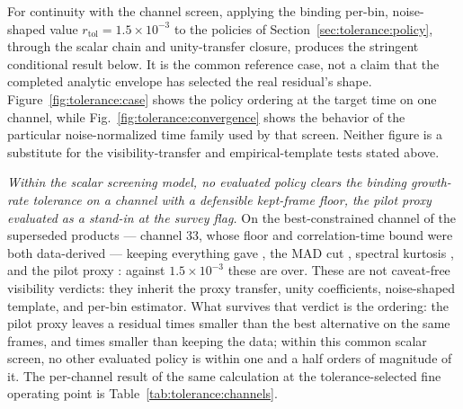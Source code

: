 For continuity with the channel screen, applying the binding per-bin, noise-shaped value $r_{\text{tol}}=1.5\times10^{-3}$ to the policies of Section~\ref{sec:tolerance:policy}, through the scalar chain and unity-transfer closure, produces the stringent conditional result below.  It is the common reference case, not a claim that the completed analytic envelope has selected the real residual's shape. Figure~\ref{fig:tolerance:case} shows the policy ordering at the target time on one channel, while Fig.~\ref{fig:tolerance:convergence} shows the behavior of the particular noise-normalized time family used by that screen.  Neither figure is a substitute for the visibility-transfer and empirical-template tests stated above.

\emph{Within the scalar screening model, no evaluated policy clears the binding growth-rate tolerance on a channel with a defensible kept-frame floor, the pilot proxy evaluated as a stand-in at the survey flag.} On the best-constrained channel of the superseded products --- channel 33, whose floor and correlation-time bound were both data-derived --- keeping everything gave , the MAD cut , spectral kurtosis , and the pilot proxy : against $1.5\times10^{-3}$ these are  over.  These are not caveat-free visibility verdicts: they inherit the proxy transfer, unity coefficients, noise-shaped template, and per-bin estimator.  What survives that verdict is the ordering: the pilot proxy leaves a residual  times smaller than the best alternative on the same frames, and  times smaller than keeping the data; within this common scalar screen, no other evaluated policy is within one and a half orders of magnitude of it.  The per-channel result of the same calculation at the tolerance-selected fine operating point is Table~\ref{tab:tolerance:channels}.

